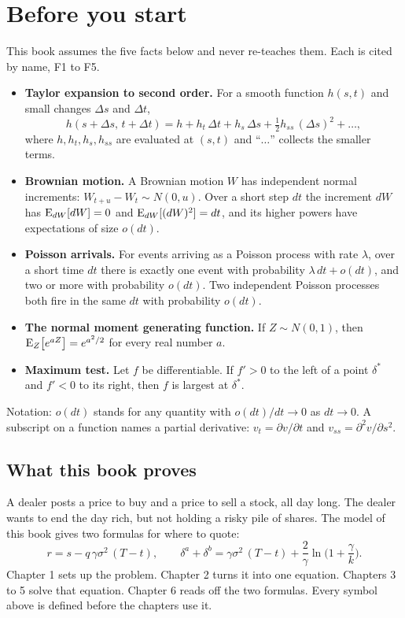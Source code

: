 \chapter{Before you start}

\begin{prereq}
This book assumes the five facts below and never re-teaches them. Each is cited by name, F1 to F5.
\begin{itemize}
  \item[\textbf{F1}] \textbf{Taylor expansion to second order.} For a smooth function $h(s,t)$ and small changes $\Delta s$ and $\Delta t$,
  \[
    h(s+\Delta s,\,t+\Delta t)=h+h_t\,\Delta t+h_s\,\Delta s+\tfrac12 h_{ss}\,(\Delta s)^2+\dots,
  \]
  where $h,h_t,h_s,h_{ss}$ are evaluated at $(s,t)$ and ``$\dots$'' collects the smaller terms.
  \item[\textbf{F2}] \textbf{Brownian motion.} A Brownian motion $W$ has independent normal increments: $W_{t+u}-W_t\sim N(0,u)$. Over a short step $dt$ the increment $dW$ has $\operatorname{E}_{dW}[dW]=0$ and $\operatorname{E}_{dW}[(dW)^2]=dt$, and its higher powers have expectations of size $o(dt)$.
  \item[\textbf{F3}] \textbf{Poisson arrivals.} For events arriving as a Poisson process with rate $\lambda$, over a short time $dt$ there is exactly one event with probability $\lambda\,dt+o(dt)$, and two or more with probability $o(dt)$. Two independent Poisson processes both fire in the same $dt$ with probability $o(dt)$.
  \item[\textbf{F4}] \textbf{The normal moment generating function.} If $Z\sim N(0,1)$, then $\operatorname{E}_Z\!\left[e^{aZ}\right]=e^{a^2/2}$ for every real number $a$.
  \item[\textbf{F5}] \textbf{Maximum test.} Let $f$ be differentiable. If $f'>0$ to the left of a point $\delta^*$ and $f'<0$ to its right, then $f$ is largest at $\delta^*$.
\end{itemize}
Notation: $o(dt)$ stands for any quantity with $o(dt)/dt\to0$ as $dt\to0$. A subscript on a function names a partial derivative: $v_t=\partial v/\partial t$ and $v_{ss}=\partial^2v/\partial s^2$.
\end{prereq}

\section*{What this book proves}
A dealer posts a price to buy and a price to sell a stock, all day long. The dealer wants to end the day rich, but not holding a risky pile of shares. The model of this book gives two formulas for where to quote:
\[
  r=s-q\,\gamma\sigma^2\,(T-t),\qquad
  \delta^a+\delta^b=\gamma\sigma^2\,(T-t)+\frac{2}{\gamma}\ln\!\Big(1+\frac{\gamma}{k}\Big).
\]
Chapter 1 sets up the problem. Chapter 2 turns it into one equation. Chapters 3 to 5 solve that equation. Chapter 6 reads off the two formulas. Every symbol above is defined before the chapters use it.

